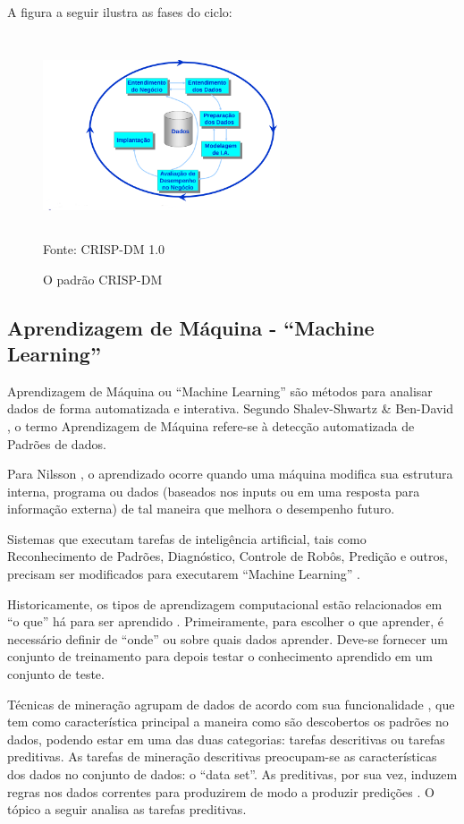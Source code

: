 \documentclass[conference,compsoc]{IEEEtran}
\begin{document}
A figura a seguir ilustra as fases do ciclo:

\begin{figure}[!ht]
\centering
\caption{O padrão CRISP-DM \cite{Crisp2000}}
\vspace{1mm}
\includegraphics[width=70mm, height=60mm]{Figuras/CrispDM.png}\\
\tiny Fonte: CRISP-DM 1.0
\end{figure}


\subsection{Aprendizagem de Máquina - ``Machine Learning''}

Aprendizagem de Máquina ou ``Machine Learning'' são métodos para analisar dados de forma automatizada e interativa.
Segundo Shalev-Shwartz \& Ben-David \cite{Ben-David2014}, o termo Aprendizagem de Máquina refere-se à detecção automatizada de Padrões de dados.

Para Nilsson \cite{Nilsson2005}, o aprendizado ocorre quando uma máquina modifica sua estrutura interna, programa ou dados 
(baseados nos inputs ou em uma resposta para informação externa) de tal maneira que melhora o desempenho futuro.

Sistemas que executam tarefas de inteligência artificial, tais como Reconhecimento de Padrões, Diagnóstico, Controle de Robôs, Predição e 
outros, precisam ser modificados para executarem ``Machine Learning'' \cite{Nilsson2005}.

Historicamente, os tipos de aprendizagem computacional estão relacionados em ``o que'' há para ser aprendido \cite{Nilsson2005}. 
Primeiramente, para escolher o que aprender, é necessário definir de ``onde'' ou sobre quais dados aprender.
Deve-se fornecer um conjunto de treinamento para depois testar o conhecimento aprendido em um conjunto de teste.

Técnicas de mineração agrupam de dados de acordo com sua funcionalidade \cite{DataMining2}, que tem como característica principal a maneira como 
são descobertos os padrões no dados, podendo estar em uma das duas categorias: tarefas descritivas ou tarefas preditivas. 
As tarefas de mineração descritivas preocupam-se as características dos dados no conjunto de dados: o ``data set''. 
As preditivas, por sua vez, induzem regras nos dados correntes para produzirem de modo a produzir predições \cite{DataMining2}. 
O tópico a seguir analisa as tarefas preditivas.
\end{document}
